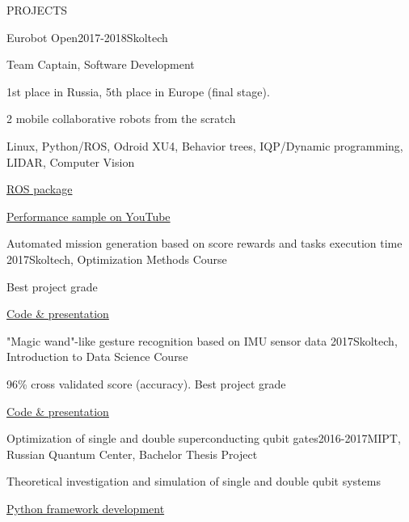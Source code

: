 \documentclass{resume} %
\begin{document}
\begin{rSection}{PROJECTS}
\begin{rSubsection}{Eurobot Open}{2017-2018}{Skoltech}{}
\item Team Captain, Software Development
\item 1st place in Russia, 5th place in Europe (final stage).
\item 2 mobile collaborative robots from the scratch
\item Linux, Python/ROS, Odroid XU4, Behavior trees, IQP/Dynamic programming, LIDAR, Computer Vision
\item \href{https://github.com/SkoltechRobotics/ros-eurobot-2018}{ROS package} 
\item \href{https://youtu.be/9kTYelf_5CA?t=4115}{Performance sample on YouTube}
\end{rSubsection}

\begin{rSubsection}{Automated mission generation based on score rewards and tasks execution time
}{2017}{Skoltech, Optimization Methods Course}{}
\item Best project grade
\item \href{https://github.com/safoex/OptimizationMethods/blob/master/Project/Project\_s.ipynb}{Code \& presentation}
\end{rSubsection}

\begin{rSubsection}{"Magic wand"-like gesture recognition based on IMU sensor data }{2017}{Skoltech, Introduction to Data Science Course}{}
\item 96\% cross validated score (accuracy).  Best project grade
\item \href{https://github.com/MisterMap/MagicWand/blob/master/Gesture\%20classification\%20Presentation.ipynb}{Code \& presentation}
\end{rSubsection}

\begin{rSubsection}{Optimization of single and double superconducting qubit gates}{2016-2017}{MIPT, Russian Quantum Center, Bachelor Thesis Project}{}
\item Theoretical investigation and simulation of single and double qubit systems
\item \href{https://github.com/safoex/qubitlab}{Python framework development}
\end{rSubsection}



\end{rSection} 


\iffalse
\end{document}
